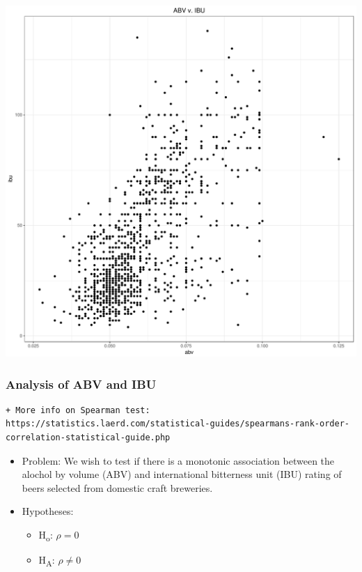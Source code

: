 \documentclass[]{article}
\providecommand{\tightlist}{%
  \setlength{\itemsep}{0pt}\setlength{\parskip}{0pt}}
\begin{document}
\begin{center}\includegraphics{Analysis_Final_files/figure-latex/unnamed-chunk-22-1} \end{center}

\subsubsection{Analysis of ABV and IBU}\label{analysis-of-abv-and-ibu}

\begin{verbatim}
+ More info on Spearman test: https://statistics.laerd.com/statistical-guides/spearmans-rank-order-correlation-statistical-guide.php
\end{verbatim}

\begin{itemize}
\item
  Problem: We wish to test if there is a monotonic association between
  the alochol by volume (ABV) and international bitterness unit (IBU)
  rating of beers selected from domestic craft breweries.
\item
  Hypotheses:

  \begin{itemize}
  \tightlist
  \item
    H\textsubscript{o}: \(\rho= 0\)
  \item
    H\textsubscript{A}: \(\rho\neq 0\)
  \end{itemize}
\end{itemize}
\end{document}
